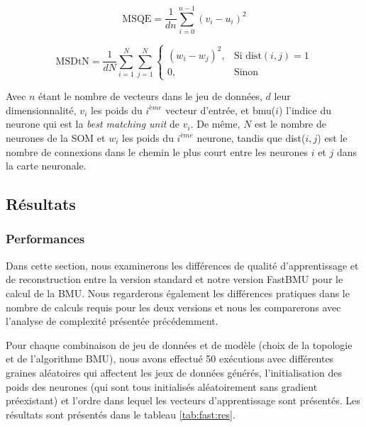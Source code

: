	\begin{equation}
		\text{MSQE} = \frac{1}{dn} \sum_{i=0}^{n-1} (v_i - u_i)^2
	\end{equation}

	\begin{equation}
    	\text{MSDtN} = \frac{1}{dN} \sum_{i=1}^{N} \sum_{j=1}^{N} 
    	\begin{cases}
        	(w_i - w_j)^2,  & \text{Si dist}(i, j) = 1\\
        	0,              & \text{Sinon}
    	\end{cases}
	\end{equation}

	Avec $n$ étant le nombre de vecteurs dans le jeu de données, $d$ leur dimensionnalité, $v_i$ les poids du $i^{ème}$ vecteur d'entrée, et bmu($i$) l'indice du neurone qui est la \textit{best matching unit} de $v_i$. De même, $N$ est le nombre de neurones de la SOM et $w_i$ les poids du $i^{ème}$ neurone, tandis que dist($i, j$) est le nombre de connexions dans le chemin le plus court entre les neurones $i$ et $j$ dans la carte neuronale.

	\subsection{Résultats}
	\subsubsection{Performances}

	Dans cette section, nous examinerons les différences de qualité d'apprentissage et de reconstruction entre la version standard et notre version FastBMU pour le calcul de la BMU. Nous regarderons également les différences pratiques dans le nombre de calculs requis pour les deux versions et nous les comparerons avec l'analyse de complexité présentée précédemment.

	Pour chaque combinaison de jeu de données et de modèle (choix de la topologie et de l'algorithme BMU), nous avons effectué 50 exécutions avec différentes graines aléatoires qui affectent les jeux de données générés, l'initialisation des poids des neurones (qui sont tous initialisés aléatoirement sans gradient préexistant) et l'ordre dans lequel les vecteurs d'apprentissage sont présentés. Les résultats sont présentés dans le tableau \ref{tab:fast:res}.

